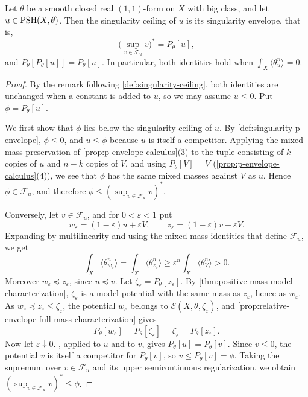 \begin{theorem}\label{thm:arbitrary-mass-ceiling-envelope}
Let $\theta$ be a smooth closed real $(1,1)$-form on $X$ with big class, and let $u\in\mathrm{PSH}(X,\theta)$. Then the singularity ceiling of $u$ is its singularity envelope, that is,
\[
 \Big(\sup_{v\in\mathcal F_u}v\Big)^*=P_\theta[u],
\]
and $P_\theta[P_\theta[u]]=P_\theta[u]$. In particular, both identities hold when $\int_X\langle\theta_u^n\rangle=0$.
\end{theorem}
\begin{proof}
By the remark following \cref{def:singularity-ceiling}, both identities are unchanged when a constant is added to $u$, so we may assume $u\leq0$. Put $\phi=P_\theta[u]$.

We first show that $\phi$ lies below the singularity ceiling of $u$. By \cref{def:singularity-p-envelope}, $\phi\leq0$, and $u\leq\phi$ because $u$ is itself a competitor. Applying the mixed mass preservation of \cref{prop:p-envelope-calculus}(3) to the tuple consisting of $k$ copies of $u$ and $n-k$ copies of $V$, and using $P_\theta[V]=V$ (\cref{prop:p-envelope-calculus}(4)), we see that $\phi$ has the same mixed masses against $V$ as $u$. Hence $\phi\in\mathcal F_u$, and therefore $\phi\leq(\sup_{v\in\mathcal F_u}v)^*$.

Conversely, let $v\in\mathcal F_u$, and for $0<\varepsilon<1$ put
\[
 w_\varepsilon=(1-\varepsilon)u+\varepsilon V,
 \qquad z_\varepsilon=(1-\varepsilon)v+\varepsilon V.
\]
Expanding by multilinearity and using the mixed mass identities that define $\mathcal F_u$, we get
\[
 \int_X\langle\theta_{w_\varepsilon}^n\rangle
   =\int_X\langle\theta_{z_\varepsilon}^n\rangle
   \geq\varepsilon^n\int_X\langle\theta_V^n\rangle>0.
\]
Moreover $w_\varepsilon\preceq z_\varepsilon$, since $u\preceq v$. Let $\zeta_\varepsilon=P_\theta[z_\varepsilon]$. By \cref{thm:positive-mass-model-characterization}, $\zeta_\varepsilon$ is a model potential with the same mass as $z_\varepsilon$, hence as $w_\varepsilon$. As $w_\varepsilon\preceq z_\varepsilon\leq\zeta_\varepsilon$, the potential $w_\varepsilon$ belongs to $\mathcal E(X,\theta,\zeta_\varepsilon)$, and \cref{prop:relative-envelope-full-mass-characterization} gives
\[
 P_\theta[w_\varepsilon]=P_\theta[\zeta_\varepsilon]=\zeta_\varepsilon
                                      =P_\theta[z_\varepsilon].
\]
Now let $\varepsilon\downarrow0$. , applied to $u$ and to $v$, gives $P_\theta[u]=P_\theta[v]$. Since $v\leq0$, the potential $v$ is itself a competitor for $P_\theta[v]$, so $v\leq P_\theta[v]=\phi$. Taking the supremum over $v\in\mathcal F_u$ and its upper semicontinuous regularization, we obtain $(\sup_{v\in\mathcal F_u}v)^*\leq\phi$.


\end{proof}
